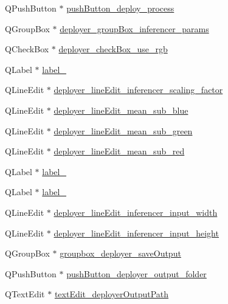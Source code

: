 \begin{DoxyCompactItemize}
\item 
Q\+Push\+Button $\ast$ \hyperlink{class_ui___main_window_a675768ae37bd76796ea5ab0a5ac8ae38}{push\+Button\+\_\+deploy\+\_\+process}
\item 
Q\+Group\+Box $\ast$ \hyperlink{class_ui___main_window_ab8b57138fec0228ed132e4ef94111936}{deployer\+\_\+group\+Box\+\_\+inferencer\+\_\+params}
\item 
Q\+Check\+Box $\ast$ \hyperlink{class_ui___main_window_aacfee2b6106263b687f7a014b4903978}{deployer\+\_\+check\+Box\+\_\+use\+\_\+rgb}
\item 
Q\+Label $\ast$ \hyperlink{class_ui___main_window_aeb8388bb9209afe6d268468bf17d4bf6}{label\+\_}
\item 
Q\+Line\+Edit $\ast$ \hyperlink{class_ui___main_window_a7d562a80543af7099184a7d9e143e235}{deployer\+\_\+line\+Edit\+\_\+inferencer\+\_\+scaling\+\_\+factor}
\item 
Q\+Line\+Edit $\ast$ \hyperlink{class_ui___main_window_a06e65f199950507c47fcc943bf265298}{deployer\+\_\+line\+Edit\+\_\+mean\+\_\+sub\+\_\+blue}
\item 
Q\+Line\+Edit $\ast$ \hyperlink{class_ui___main_window_aa6ca052b51c0bd10b0a9452ee144ce1b}{deployer\+\_\+line\+Edit\+\_\+mean\+\_\+sub\+\_\+green}
\item 
Q\+Line\+Edit $\ast$ \hyperlink{class_ui___main_window_a4f2876497ed960b9001cc271e5e0aad4}{deployer\+\_\+line\+Edit\+\_\+mean\+\_\+sub\+\_\+red}
\item 
Q\+Label $\ast$ \hyperlink{class_ui___main_window_aa0d07c96f36b94e35e584256ee6b6d9e}{label\+\_}
\item 
Q\+Label $\ast$ \hyperlink{class_ui___main_window_a5250e633d2b0dac0d683e2e2c83b8513}{label\+\_}
\item 
Q\+Line\+Edit $\ast$ \hyperlink{class_ui___main_window_af6c02b90406cc77397f166928a788ba7}{deployer\+\_\+line\+Edit\+\_\+inferencer\+\_\+input\+\_\+width}
\item 
Q\+Line\+Edit $\ast$ \hyperlink{class_ui___main_window_a11a0ad4c6365f77deee4cdbbc2970f54}{deployer\+\_\+line\+Edit\+\_\+inferencer\+\_\+input\+\_\+height}
\item 
Q\+Group\+Box $\ast$ \hyperlink{class_ui___main_window_a8bfda7f4679a6309fea86cd6c79c4079}{groupbox\+\_\+deployer\+\_\+save\+Output}
\item 
Q\+Push\+Button $\ast$ \hyperlink{class_ui___main_window_aafb902cf3c987152453a8240fa67d2a9}{push\+Button\+\_\+deployer\+\_\+output\+\_\+folder}
\item 
Q\+Text\+Edit $\ast$ \hyperlink{class_ui___main_window_a1d8d928f884df77d640674acc208338e}{text\+Edit\+\_\+deployer\+Output\+Path}

\end{DoxyCompactItemize}
